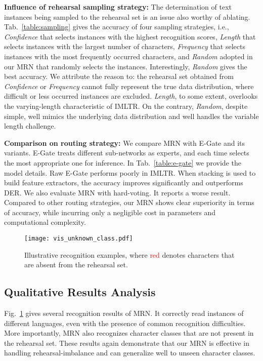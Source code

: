 \documentclass[10pt,twocolumn,letterpaper]{article}
\begin{document}
\noindent\textbf{Influence of rehearsal sampling strategy:} The determination of text instances being sampled to the rehearsal set is an issue also worthy of ablating. Tab.~\ref{table:sampling} gives the accuracy of four sampling strategies, i.e., \emph{Confidence} that selects instances with the highest recognition scores, \emph{Length} that selects instances with the largest number of characters, \emph{Frequency} that selects instances with the most frequently occurred characters, and \emph{Random} adopted in our MRN that randomly selects the instances. Interestingly, \emph{Random} gives the best accuracy. We attribute the reason to: the rehearsal set obtained from \emph{Confidence} or \emph{Frequency} cannot fully represent the true data distribution, where difficult or less occurred instances are excluded. \emph{Length}, to some extent, overlooks the varying-length characteristic of IMLTR. On the contrary, \emph{Random}, despite simple, well mimics the underlying data distribution and well handles the variable length challenge.


\noindent\textbf{Comparison on routing strategy:} We compare MRN with E-Gate and its variants. E-Gate \cite{Aljundi2017expert_gate} treats different sub-networks as experts, and each time selects the most appropriate one for inference. In Tab.~\ref{table:e-gate} we provide the model details. Raw E-Gate performs poorly in IMLTR. When stacking is used to build feature extractors, the accuracy improves significantly and outperforms DER. We also evaluate MRN with hard-voting. It reports a worse result. Compared to other routing strategies, our MRN shows clear superiority in terms of accuracy, while incurring only a negligible cost in parameters and computational complexity.


\begin{figure}[]
\centering
\texttt{[image: vis\_unknown\_class.pdf]}
\caption{Illustrative recognition examples, where \textcolor{red}{red} denotes characters that are absent from the rehearsal set.}
\label{fig:unclass_vis}
\end{figure}


\subsection{Qualitative Results Analysis}
Fig.~\ref{fig:unclass_vis} gives several recognition results of MRN. It correctly read instances of different languages, even with the presence of common recognition difficulties. More importantly, MRN also recognizes character classes that are not present in the rehearsal set. These results again demonstrate that our MRN is effective in handling rehearsal-imbalance and can generalize well to unseen character classes.
\end{document}
